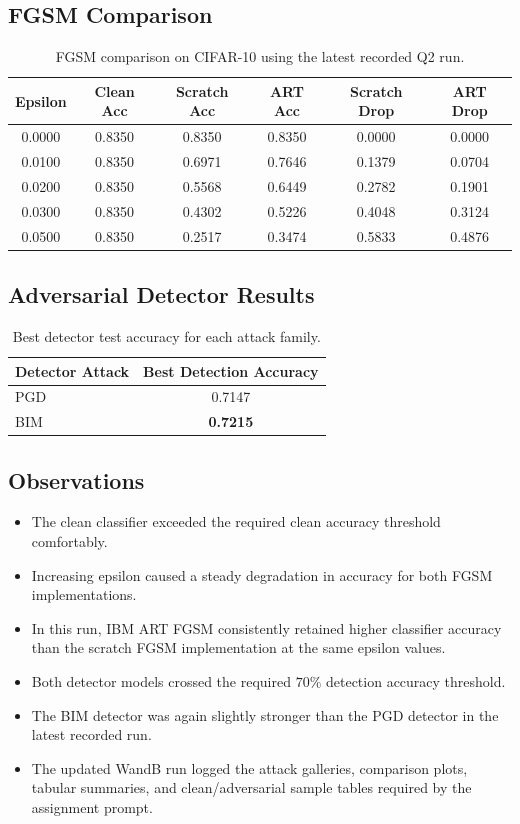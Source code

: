 \documentclass[11pt]{article}
\begin{document}
\subsection{FGSM Comparison}
\begin{table}[H]
\centering
\caption{FGSM comparison on CIFAR-10 using the latest recorded Q2 run.}
\label{tab:q2-fgsm}
\begin{tabular}{cccccc}
\toprule
Epsilon & Clean Acc & Scratch Acc & ART Acc & Scratch Drop & ART Drop \\
\midrule
0.0000 & 0.8350 & 0.8350 & 0.8350 & 0.0000 & 0.0000 \\
0.0100 & 0.8350 & 0.6971 & 0.7646 & 0.1379 & 0.0704 \\
0.0200 & 0.8350 & 0.5568 & 0.6449 & 0.2782 & 0.1901 \\
0.0300 & 0.8350 & 0.4302 & 0.5226 & 0.4048 & 0.3124 \\
0.0500 & 0.8350 & 0.2517 & 0.3474 & 0.5833 & 0.4876 \\
\bottomrule
\end{tabular}
\end{table}

\subsection{Adversarial Detector Results}
\begin{table}[H]
\centering
\caption{Best detector test accuracy for each attack family.}
\label{tab:q2-detectors}
\begin{tabular}{lc}
\toprule
Detector Attack & Best Detection Accuracy \\
\midrule
PGD & 0.7147 \\
BIM & \textbf{0.7215} \\
\bottomrule
\end{tabular}
\end{table}

\subsection{Observations}
\begin{itemize}
    \item The clean classifier exceeded the required clean accuracy threshold comfortably.
    \item Increasing epsilon caused a steady degradation in accuracy for both FGSM implementations.
    \item In this run, IBM ART FGSM consistently retained higher classifier accuracy than the scratch FGSM implementation at the same epsilon values.
    \item Both detector models crossed the required \(70\%\) detection accuracy threshold.
    \item The BIM detector was again slightly stronger than the PGD detector in the latest recorded run.
    \item The updated WandB run logged the attack galleries, comparison plots, tabular summaries, and clean/adversarial sample tables required by the assignment prompt.
\end{itemize}
\end{document}

